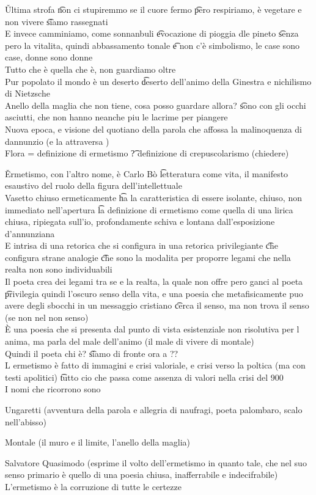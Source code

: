 \documentclass[12pt]{article}
\begin{document}
\v

Ultima strofa \t non ci stupiremmo se il cuore fermo \t pero respiriamo, è vegetare e non vivere \t siamo rassegnati \\
E invece camminiamo, come sonnanbuli \t evocazione di pioggia dle pineto \t senza pero la vitalita, quindi abbassamento tonale \t e non c'è simbolismo, le case sono case, donne sono donne \\
Tutto che è quella che è, non guardiamo oltre \\
Pur popolato il mondo è un deserto \t deserto dell'animo della Ginestra e nichilismo di Nietzsche \\
Anello della maglia che non tiene, cosa posso guardare allora? \t sono con gli occhi asciutti, che non hanno neanche piu le lacrime per piangere \\
Nuova epoca, e visione del quotiano della parola che affossa la malinoquenza di dannunzio (e la attraversa ) \\
Flora = definizione di ermetismo \t ? definizione di crepuscolarismo (chiedere)

\v

Ermetismo, con l'altro nome, è Carlo Bò \t letteratura come vita, il manifesto esaustivo del ruolo della figura dell'intellettuale \\
Vasetto chiuso ermeticamente \t ha la caratteristica di essere isolante, chiuso, non immediato nell'apertura \t la definizione di ermetismo come quella di una lirica chiusa, ripiegata sull'io, profondamente schiva e lontana dall'esposizione d'annunziana \\
E intrisa di una retorica che si configura in una retorica privilegiante \t che configura strane analogie \t che sono la modalita per proporre legami che nella realta non sono individuabili \\
Il poeta crea dei legami tra se e la realta, la quale non offre pero ganci al poeta \t privilegia quindi l'oscuro senso della vita, e una poesia che metafisicamente puo avere degli sbocchi in un messaggio cristiano \t cerca il senso, ma non trova il senso (se non nel non senso) \\
È una poesia che si presenta dal punto di vista esistenziale non risolutiva per l anima, ma parla del male dell'animo (il male di vivere di montale) \\
Quindi il poeta chi è? \t siamo di fronte ora a ?? \\
L ermetismo è fatto di immagini e crisi valoriale, e crisi verso la poltica (ma con testi apolitici) \t tutto cio che passa come assenza di valori nella crisi del 900 \\
I nomi che ricorrono sono 
\bi
  \item Ungaretti (avventura della parola e allegria di naufragi, poeta palombaro, scalo nell'abisso)
  \item Montale (il muro e il limite, l'anello della maglia)
  \item Salvatore Quasimodo (esprime il volto dell'ermetismo in quanto tale, che nel suo senso primario è quello di una poesia chiusa, inafferrabile e indecifrabile)
\ei
L'ermetismo è la corruzione di tutte le certezze
\end{document}
